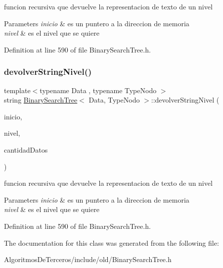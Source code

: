 funcion recursiva que devuelve la representacion de texto de un nivel 


\begin{DoxyParams}{Parameters}
{\em inicio} & es un puntero a la direccion de memoria \\
\hline
{\em nivel} & es el nivel que se quiere \\
\hline
\end{DoxyParams}


Definition at line 590 of file Binary\+Search\+Tree.\+h.

\mbox{\label{class_binary_search_tree_a30a79ed298da4d6fe4395dddd53842b8}} 
\subsubsection{\texorpdfstring{devolver\+String\+Nivel()}{devolverStringNivel()}\hspace{0.1cm}{\footnotesize\ttfamily [2/2]}}
{\footnotesize\ttfamily template$<$typename Data , typename Type\+Nodo $>$ \\
string \hyperlink{class_binary_search_tree}{Binary\+Search\+Tree}$<$ Data, Type\+Nodo $>$\+::devolver\+String\+Nivel (\begin{DoxyParamCaption}\item[{\hyperlink{class_class_node}{Class\+Node}$<$ Data $>$ $\ast$}]{inicio,  }\item[{int}]{nivel,  }\item[{int}]{cantidad\+Datos }\end{DoxyParamCaption})\hspace{0.3cm}{\ttfamily [inline]}}



funcion recursiva que devuelve la representacion de texto de un nivel 


\begin{DoxyParams}{Parameters}
{\em inicio} & es un puntero a la direccion de memoria \\
\hline
{\em nivel} & es el nivel que se quiere \\
\hline
\end{DoxyParams}


Definition at line 590 of file Binary\+Search\+Tree.\+h.



The documentation for this class was generated from the following file\+:\begin{DoxyCompactItemize}
\item 
Algoritmos\+De\+Terceros/include/old/Binary\+Search\+Tree.\+h\end{DoxyCompactItemize}
